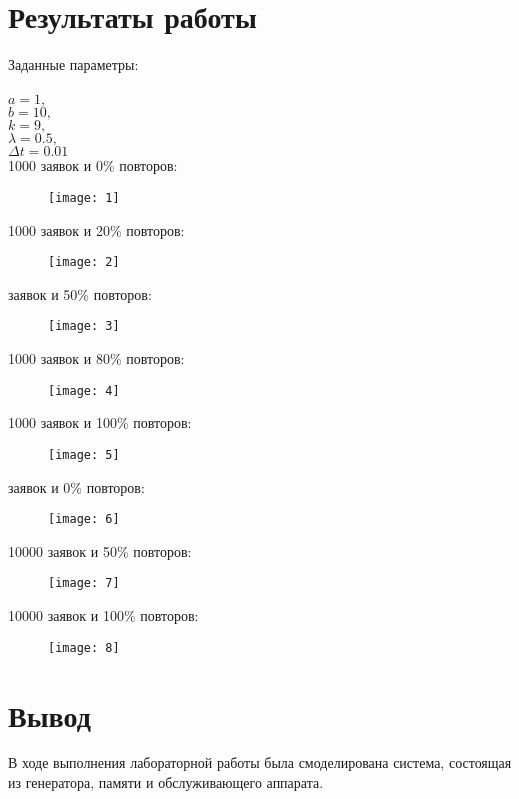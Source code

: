 \documentclass[a4paper, 14pt]{article}
\begin{document}
\section*{Результаты работы}

Заданные параметры:\\ \\
$a = 1,$\\
$b = 10,$\\
$k = 9,$\\
$\lambda = 0.5,$\\
$\Delta t= 0.01$\\


1000 заявок и 0\% повторов:
\begin{figure}[H]
    \texttt{[image: 1]}
    \label{fig:}
\end{figure}


1000 заявок и 20\% повторов:
\begin{figure}[H]
    \texttt{[image: 2]}
    \label{fig:}
\end{figure}

 заявок и 50\% повторов:
\begin{figure}[H]
    \texttt{[image: 3]}
    \label{fig:}
\end{figure}


1000 заявок и 80\% повторов:
\begin{figure}[H]
    \texttt{[image: 4]}
    \label{fig:}
\end{figure}


1000 заявок и 100\% повторов:
\begin{figure}[H]
    \texttt{[image: 5]}
    \label{fig:}
\end{figure}

 заявок и 0\% повторов:
\begin{figure}[H]
    \texttt{[image: 6]}
    \label{fig:}
\end{figure}


10000 заявок и 50\% повторов:
\begin{figure}[H]
    \texttt{[image: 7]}
    \label{fig:}
\end{figure}

10000 заявок и 100\% повторов:
\begin{figure}[H]
    \texttt{[image: 8]}
    \label{fig:}
\end{figure}


\section*{Вывод}
В ходе выполнения лабораторной работы была смоделирована система, состоящая из генератора, памяти и обслуживающего аппарата.
\end{document}
